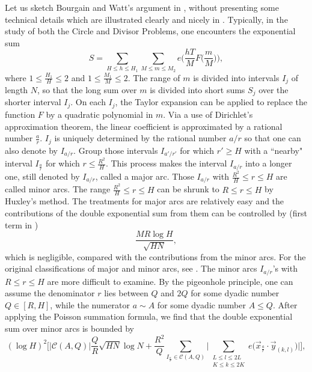 \documentclass[11pt]{amsart}
\numberwithin{equation}{section}
\theoremstyle{definition}
\theoremstyle{proposition}
\begin{document}
Let us sketch Bourgain and Watt's argument in \cite[Section 5]{BourgainWatt2nd}, without presenting some technical details which are illustrated clearly and nicely in \cite[Section 5]{BourgainWatt2nd}. 
Typically, in the study of both the Circle and Divisor Problems,  one encounters the exponential sum \cite[(5.1)]{BourgainWatt2nd}
\[
S=\sum_{H\le h \le H_1} \sum_{M\le m\le M_2}e \Big(\frac{hT}{M}F\Big( \frac{m}{M} \Big) \Big),
\]
where $1\le \frac{H_1}{H}\le 2$ and $1\le \frac{M_1}{M}\le 2$.  The range of $m$ is divided  into intervals $I_j$ of length $N$, so that the long sum over $m$ is divided into short sums $S_j$ over the shorter interval $I_j$. On each $I_j$, the Taylor expansion
can be applied to replace the function $F$ by a quadratic polynomial in $m$.  Via a use of Dirichlet's approximation theorem, the linear coefficient is approximated
by a rational number $\frac{a}{r}$. $I_j$ is uniquely determined by the rational number $a/r$ so that one can also denote 
by $I_{a/r}$. Group those intervals $I_{{a'}/{r'}}$ for which $r'\ge H$ with a ``nearby" interval $I_{\frac{a}{r}}$ for which $r\le \frac{R^2}{H}$.  This process makes the interval  $I_{a/r}$ into a longer one, still denoted by ${I_{a/r}}$, called a major arc. Those $I_{a/r}$ with $\frac{R^2}{H}\le r\le H$ are called minor arcs. The range $\frac{R^2}{H}\le r\le H$ can be shrunk
to  $R\le r\le H$ by Huxley's method.  The treatments for major arcs are relatively easy and the contributions of the double exponential sum from them can be controlled by (first term in \cite[(5.6)]{BourgainWatt2nd})
\[
\frac{MR\log H}{\sqrt{HN}},
\]
which is negligible,  compared with the contributions from the minor arcs. For the original classifications of major and minor arcs, see \cite[Section 3]{HuxleyCircle1}. 
The minor arcs $I_{a/r}$'s with $R\leq r\leq H$ are more difficult to examine.  By the pigeonhole principle, one can assume 
the denominator $r$ lies between $Q$ and $2Q$ for some dyadic number $Q\in [R, H]$, while the numerator 
$a\sim A$ for some dyadic number $A\leq Q$. After applying the Poisson summation formula, we find that the double exponential sum over minor arcs is bounded by \cite[(5.6) and (5.9)]{BourgainWatt2nd}
\[
(\log H)^2 \Big[|\mathcal{C}(A,Q)|\frac{Q}{R}\sqrt{HN}\log N
+\frac{R^2}{Q} \sum_{I_{\frac{a}{r}}\in \mathcal{C}(A,Q)}\Big| \mathop{\sum}\limits_{\substack{L\le l\le 2L \\K\le k\le 2K}} e\Big( \Vec{x}_{\frac{a}{r}}\cdot \Vec{y}_{(k,l)} \Big) \Big|\Big],
\]
\end{document}

